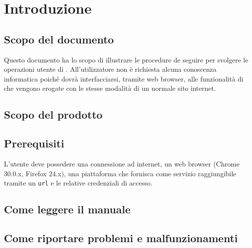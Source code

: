 \section{Introduzione}


\subsection{Scopo del documento}
Questo documento ha lo scopo di illustrare le procedure de seguire per svolgere le operazioni utente di . All'utilizzatore non è richiesta alcuna conoscenza informatica poiché dovrà interfacciarsi, tramite web browser, alle funzionalità di  che vengono erogate con le stesse modalità di un normale sito internet.

\subsection{Scopo del prodotto}
\ScopoDelProdotto{} 

\subsection{Prerequisiti}
L'utente deve possedere una connessione ad internet, un web browser (Chrome 30.0.x, Firefox 24.x), una piattaforma che fornisca  come servizio raggiungibile tramite un \texttt{url} e le relative credenziali di accesso.

\subsection{Come leggere il manuale}

\subsection{Come riportare problemi e malfunzionamenti}






